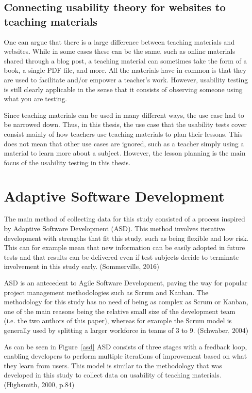 \subsection{Connecting usability theory for websites to teaching materials}

One can argue that there is a large difference between teaching materials and websites. While in some cases these can be the same, such as online materials shared through a blog post, a teaching material can sometimes take the form of a book, a single PDF file, and more. All the materials have in common is that they are used to facilitate and/or empower a teacher's work. However, usability testing is still clearly applicable in the sense that it consists of observing someone using what you are testing.

Since teaching materials can be used in many different ways, the use case had to be narrowed down. Thus, in this thesis, the use case that the usability tests cover consist mainly of how teachers use teaching materials to plan their lessons. This does not mean that other use cases are ignored, such as a teacher simply using a material to learn more about a subject. However, the lesson planning is the main focus of the usability testing in this thesis.

\section{Adaptive Software Development}
The main method of collecting data for this study consisted of a process inspired by Adaptive Software Development (ASD). This method involves iterative development with strengths that fit this study, such as being flexible and low risk. This can for example mean that new information
can be easily adopted in future tests and that results can be delivered even if test subjects decide to terminate involvement in this study early. (Sommerville, 2016)

ASD is an antecedent to Agile Software Development, paving the way for popular project management methodologies such as Scrum and Kanban. The methodology for this study has no need of being as complex as Scrum or Kanban, one of the main reasons being the relative small size of the development team (i.e. the two authors of this paper), whereas for example the Scrum model is generally used by splitting a larger workforce in teams of 3 to 9. (Schwaber, 2004)

As can be seen in Figure~\ref{asd} ASD consists of three stages with a feedback loop, enabling developers to perform multiple iterations of improvement based on what they learn from users. This model is similar to the methodology that was developed in this study to collect data on usability of teaching materials. (Highsmith, 2000, p.84)


